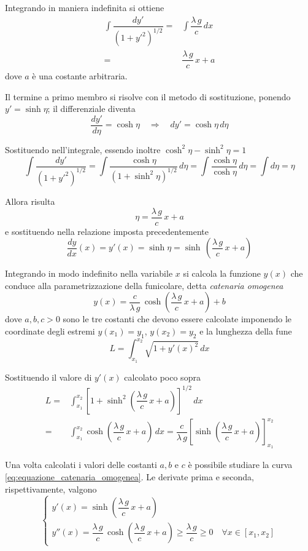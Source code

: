 Integrando in maniera indefinita si ottiene
\begin{align*}
 \int \dfrac{dy'}{\left(1+y'^2\right)^{1/2}} =&\int \dfrac{\lambda\,g}{c}\,dx\\
 =& \dfrac{\lambda\,g}{c}\,x + a
\end{align*}
dove $a$ è una costante arbitraria.

Il termine a primo membro si risolve con il metodo di sostituzione, ponendo $y' = \sinh \eta$; il differenziale diventa
\[
 \dfrac{dy'}{d\eta} = \cosh\eta \quad \Longrightarrow\quad dy' = \cosh\eta\,d\eta
\]

Sostituendo nell'integrale, essendo inoltre $\cosh^2\eta - \sinh^2\eta = 1$
\[
 \int \dfrac{dy'}{\left(1+y'^2\right)^{1/2}} = \int \dfrac{\cosh\eta}{(1+\sinh^2\eta)^{1/2}}\,d\eta = \int \dfrac{\cosh\eta}{\cosh\eta}\,d\eta = \int d\eta = \eta
\]

Allora risulta
\[
\eta = \dfrac{\lambda\,g}{c}\,x + a    
\]
e sostituendo nella relazione imposta precedentemente
\[
\dfrac{dy}{dx}(x) = y'(x) = \sinh \eta = \sinh\,\left(\dfrac{\lambda\,g}{c}\,x + a\right) 
\]

Integrando in modo indefinito nella variabile $x$ si calcola la funzione $y(x)$ che conduce alla parametrizzazione della funicolare, detta \emph{catenaria omogenea}
\begin{equation}
\label{eq:equazione_catenaria_omogenea}
y(x) = \dfrac{c}{\lambda\,g}\,\cosh\left(\dfrac{\lambda\,g}{c}\,x +a\right) + b
\end{equation}
dove $a,b,c>0$ sono le tre costanti che devono essere calcolate imponendo le coordinate degli estremi $y(x_1) = y_1$, $y(x_2) = y_2$ e la lunghezza della fune
\[
  L = \int_{x_1}^{x_2} \sqrt{1+y'(x)^2}\,dx  
\]

Sostituendo il valore di $y'(x)$ calcolato poco sopra
\begin{align*}
 L =& \int_{x_1}^{x_2} \left[1+\sinh^2\left(\dfrac{\lambda\,g}{c}\,x +a\right)\right]^{1/2}\,dx\\
  =& \int_{x_1}^{x_2} \cosh\left(\dfrac{\lambda\,g}{c}\,x +a\right)\,dx = \dfrac{c}{\lambda\,g}\left[\sinh\left( \dfrac{\lambda\,g}{c}\,x +a\right)\right]_{x_1}^{x_2}
\end{align*}

Una volta calcolati i valori delle costanti $a, b$ e $c$ è possibile studiare la curva \eqref{eq:equazione_catenaria_omogenea}. Le derivate prima e seconda, rispettivamente, valgono
\[
\begin{cases}
 y'(x) = \sinh\left(\dfrac{\lambda\,g}{c}\,x +a\right)\\
 y''(x) = \dfrac{\lambda\,g}{c}\,\cosh\left(\dfrac{\lambda\,g}{c}\,x + a\right) \geq \dfrac{\lambda\,g}{c}\geq 0\quad \forall x \in[x_1, x_2] 
 \end{cases}
\]

